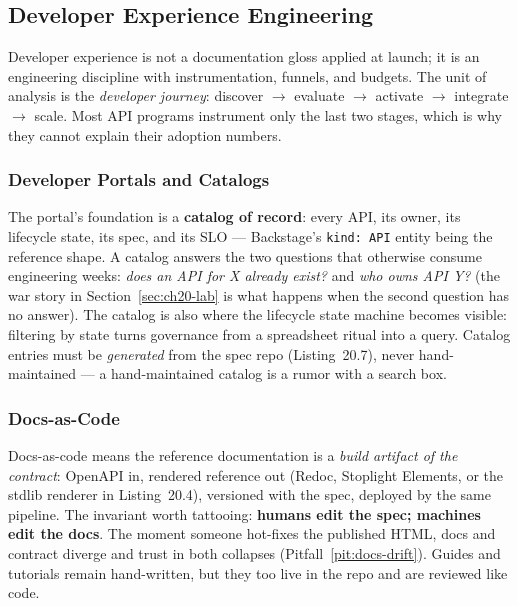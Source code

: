 \subsection{Developer Experience Engineering}
\label{sec:ch20-dx}

Developer experience is not a documentation gloss applied at launch; it is
an engineering discipline with instrumentation, funnels, and budgets. The
unit of analysis is the \emph{developer journey}: discover $\rightarrow$
evaluate $\rightarrow$ activate $\rightarrow$ integrate $\rightarrow$
scale. Most API programs instrument only the last two stages, which is why
they cannot explain their adoption numbers.

\subsubsection{Developer Portals and Catalogs}
The portal's foundation is a \textbf{catalog of record}: every API, its
owner, its lifecycle state, its spec, and its SLO --- Backstage's
\texttt{kind: API} entity being the reference shape. A catalog answers the
two questions that otherwise consume engineering weeks: \emph{does an API
for X already exist?} and \emph{who owns API Y?} (the war story in
Section~\ref{sec:ch20-lab} is what happens when the second question has no
answer). The catalog is also where the lifecycle state machine becomes
visible: filtering by state turns governance from a spreadsheet ritual
into a query. Catalog entries must be \emph{generated} from the spec repo
(Listing~20.7), never hand-maintained --- a hand-maintained
catalog is a rumor with a search box.

\subsubsection{Docs-as-Code}
Docs-as-code means the reference documentation is a \emph{build artifact
of the contract}: OpenAPI in, rendered reference out (Redoc, Stoplight
Elements, or the stdlib renderer in Listing~20.4), versioned
with the spec, deployed by the same pipeline. The invariant worth
tattooing: \textbf{humans edit the spec; machines edit the docs}. The
moment someone hot-fixes the published HTML, docs and contract diverge and
trust in both collapses (Pitfall~\ref{pit:docs-drift}). Guides and
tutorials remain hand-written, but they too live in the repo and are
reviewed like code.

